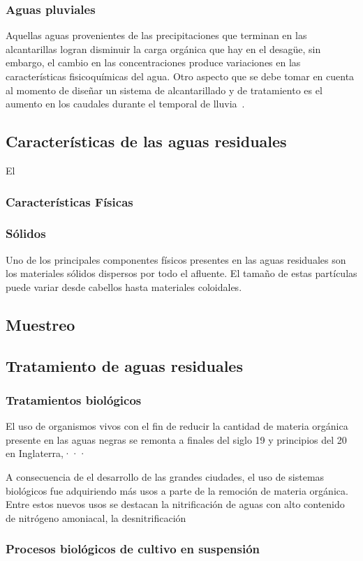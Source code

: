 \subsubsection*{Aguas pluviales}
Aquellas aguas provenientes de las precipitaciones que terminan en las alcantarillas logran disminuir la carga orgánica que hay en el desagüe, sin embargo, el cambio en las concentraciones produce variaciones en las características fisicoquímicas del agua. Otro aspecto que se debe tomar en cuenta al momento de diseñar un sistema de alcantarillado y de tratamiento es el aumento en los caudales durante el temporal de lluvia~\citep{lazcano2016}.
\subsection{Características de las aguas residuales}
El 
\subsubsection{Características Físicas}
\subsubsection*{Sólidos}
Uno de los principales componentes físicos presentes en las aguas residuales son los materiales sólidos dispersos por todo el afluente. El tamaño de estas partículas puede variar desde cabellos hasta materiales coloidales. 
\subsection{Muestreo}
\subsection{Tratamiento de aguas residuales}
\subsubsection{Tratamientos biológicos}
El uso de organismos vivos con el fin de reducir la cantidad de materia orgánica presente en las aguas negras se remonta a finales del siglo 19 y principios del 20 en Inglaterra,···\par
A consecuencia de el desarrollo de las grandes ciudades, el uso de sistemas biológicos fue adquiriendo más usos a parte de la remoción de materia orgánica. Entre estos nuevos usos se destacan la nitrificación de aguas con alto contenido de nitrógeno amoniacal, la desnitrificación 
\subsubsection*{Procesos biológicos de cultivo en suspensión}
